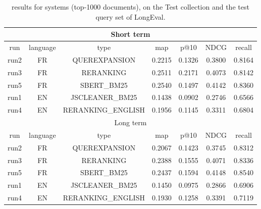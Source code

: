 \begin{table}[h!]
    \centering
    \begin{tabular}{ |c|c|c|c|c|c|c| }
        \hline
        \hline
        \multicolumn{7}{|c|}{Short term} \\ \hline
        run & language & type & map & p@10 & NDCG & recall \\ \hline
        run2 &   FR   & QUEREXPANSION & 0.2215 & 0.1326 & 0.3800 & 0.8164 \\
        run3 &   FR   & RERANKING & 0.2511 & 0.2171 & 0.4073 & 0.8142 \\
        run5 &   FR   & SBERT\_BM25 & 0.2540 & 0.1497 & 0.4142 & 0.8360 \\
        \hline
        run1 &   EN   & JSCLEANER\_BM25 & 0.1438 & 0.0902 & 0.2746 & 0.6566 \\
        run4 &   EN   & RERANKING\_ENGLISH & 0.1956 & 0.1145 & 0.3311 & 0.6804 \\
        \hline
        \hline
        \multicolumn{7}{|c|}{Long term} \\ \hline
        run  & language & type & map & p@10 & NDCG & recall \\ \hline
        run2 &   FR   & QUEREXPANSION & 0.2067 & 0.1423 & 0.3745 & 0.8312 \\
        run3 &   FR   & RERANKING & 0.2388 & 0.1555 & 0.4071 & 0.8336 \\
        run5 &   FR   & SBERT\_BM25 & 0.2437 & 0.1594 & 0.4148 & 0.8540 \\
        \hline
        run1 &   EN   & JSCLEANER\_BM25  & 0.1450 & 0.0975 & 0.2866 & 0.6906 \\
        run4 &   EN   & RERANKING\_ENGLISH & 0.1930 & 0.1258 & 0.3391 & 0.7119 \\
        \hline
    \end{tabular}
    \caption{results for systems (top-1000 documents), on the Test collection and the test query set of LongEval.}
    \label{tab:results_submission_test}
\end{table}
